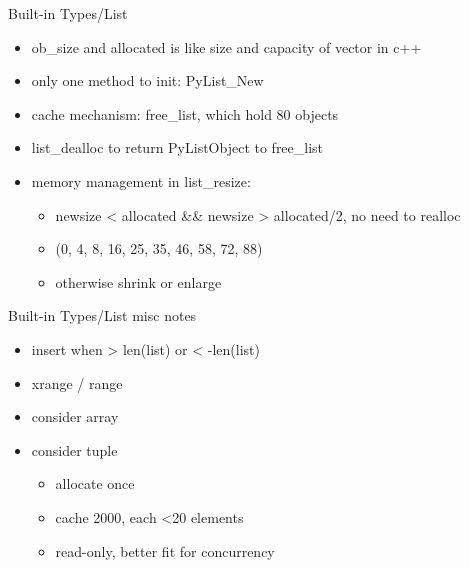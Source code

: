 \documentclass[xcolor=svgnames]{beamer}
\begin{document}
\begin{frame}{Built-in Types/List}
\begin{itemize} 
  \item ob\_size and allocated is like size and capacity of vector in c++
  \item only one method to init: PyList\_New
  \item cache mechanism: free\_list, which hold 80 objects
  \item list\_dealloc to return PyListObject to free\_list
  \item memory management in list\_resize:
    \begin{itemize} 
        \item newsize < allocated \&\& newsize > allocated/2, no need to realloc
        \item (0, 4, 8, 16, 25, 35, 46, 58, 72, 88)
        \item otherwise shrink or enlarge
    \end{itemize} 
\end{itemize} 
\end{frame}

\begin{frame}{Built-in Types/List}
misc notes
\begin{itemize} 
    \item insert when > len(list) or < -len(list)
    \item xrange / range
    \item consider array
    \item consider tuple
        \begin{itemize} 
            \item allocate once
            \item cache 2000, each <20 elements
            \item read-only, better fit for concurrency
        \end{itemize} 
\end{itemize} 
\end{frame}
\end{document}
